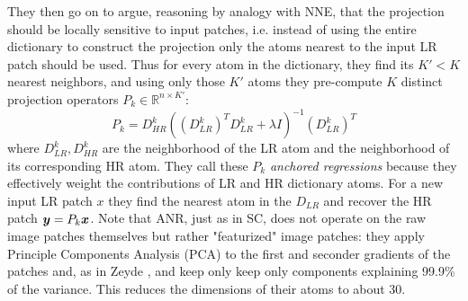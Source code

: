 %
They then go on to argue, reasoning by analogy with NNE, that the projection should be locally sensitive to input patches, i.e. instead of using the entire dictionary to construct the projection only the atoms nearest to the input LR patch should be used.
%
Thus for every atom in the dictionary, they find its $K' < K$ nearest neighbors, and using only those $K'$ atoms they pre-compute $K$ distinct projection operators $P_k \in \mathbb{R}^{n \times K'}$:
\begin{equation}
    P_k = D_{HR}^k \left( (D_{LR}^k)^T D_{LR}^k + \lambda I\right)^{-1}(D_{LR}^k)^T
    \label{eqn:datadependentmapping}
\end{equation}
where $D_{LR}^k, D_{HR}^k$ are the neighborhood of the LR atom and the neighborhood of its corresponding HR atom.
%
They call these $P_k$ \textit{anchored regressions} because they effectively weight the contributions of LR and HR dictionary atoms.
%
For a new input LR patch $x$ they find the nearest atom in the $D_{LR}$ and recover the HR patch $\bm{y} = P_k \bm{x}$.
%
Note that ANR, just as in SC, does not operate on the raw image patches themselves but rather "featurized" image patches: they apply Principle Components Analysis (PCA) to the first and seconder gradients of the patches and, as in Zeyde \etal\cite{Zeyde2012}, and keep only keep only components explaining 99.9\% of the variance.
%
This reduces the dimensions of their atoms to about 30.

